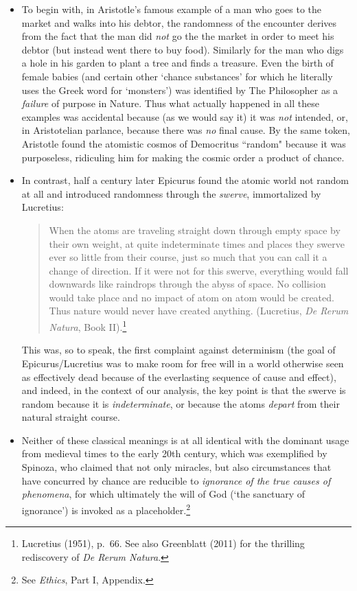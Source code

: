 \documentclass[11pt,a4paper]{article}
\numberwithin{equation}{section}
\begin{document}
 \begin{itemize}
\item To begin with, in Aristotle's famous example of a man who goes to the market and  walks into his debtor, the randomness of the encounter derives from the fact that the man did \emph{not} go the the market in order to meet his debtor (but instead went there to buy food). Similarly for the man who digs a hole in his garden to plant a tree and finds a treasure. Even the birth of female babies (and certain other `chance substances' for which he literally uses the Greek word for `monsters') was identified by The Philosopher  as a \emph{failure} of purpose in Nature. Thus what actually happened in all these examples was accidental because (as we would say it) it was \emph{not} intended, or, in Aristotelian parlance, because there was \emph{no} final cause. By the same token, Aristotle found the atomistic cosmos of Democritus ``random" because it was purposeless,  ridiculing him for making the cosmic order a product of chance. 
\item  In contrast,  half a century later Epicurus found the atomic world not random at all and introduced randomness through the \emph{swerve}, immortalized by Lucretius:
\begin{quote}\begin{small}
When the atoms are traveling straight down through empty space by their own weight, at quite indeterminate times and places they swerve ever so little from their course, just so much that you can call it a change of direction. If it were not for this swerve, everything would fall downwards like raindrops through the abyss of space. No collision would take place and no impact of atom on atom would be created. Thus nature would never have created anything. (Lucretius, \emph{De Rerum Natura}, Book II).\footnote{ Lucretius (1951), p.\ 66.  See also Greenblatt (2011) for the thrilling rediscovery of \emph{De Rerum Natura}.} \end{small}
\end{quote} 
This was, so to speak, the first complaint against determinism (the goal of Epicurus/Lucretius was to make room for free will in a world otherwise seen as effectively dead because of the everlasting sequence of cause and effect), and indeed, in the context of our analysis, the key point is that the swerve is random because it is \emph{indeterminate}, or because the atoms \emph{depart} from their natural straight course. 
\item Neither of these classical meanings is at all  identical with the dominant usage from medieval times to the early 20th century, which was exemplified by Spinoza, who  claimed that not only miracles, but also circumstances that have concurred by chance are reducible to \emph{ignorance of the true causes of phenomena}, for which ultimately the will of God (`the sanctuary of ignorance') is invoked as a placeholder.\footnote{See \emph{Ethics}, Part I, Appendix.} 

\end{itemize}
\end{document}
